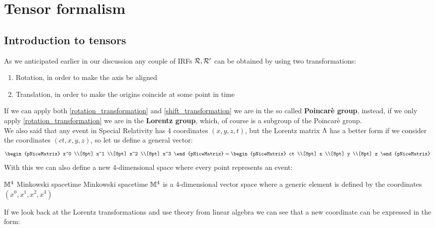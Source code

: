 \chapter{Tensor formalism}
\section{Introduction to tensors}
As we anticipated earlier in our discussion any couple of IRFs $\mathcal{R}, \mathcal{R}'$ can be obtained by using two transformations:
\begin{enumerate}
  \item Rotation, in order to make the axis be aligned \label{rotation_transformation}
  \item Translation, in order to make the origins coincide at some point in time \label{shift_transformation}
\end{enumerate}
If we can apply both \eqref{rotation_transformation} and \eqref{shift_transformation} we are in the so called \textbf{Poincarè group}, instead, if we only apply \eqref{rotation_transformation} we are in the \textbf{Lorentz group}, which, of course is a subgroup of the Poincarè group.\\
We also said that any event in Special Relativity has 4 coordinates $(x,y,z,t)$, but the Lorentz matrix $\Lambda$ has a better form if we consider the coordinates $(ct,x,y,z)$, so let us define a general vector:
\begin{equation}
  \begin{pNiceMatrix}
    x^0 \\[8pt]
    x^1 \\[8pt]
    x^2 \\[8pt]
    x^3
  \end{pNiceMatrix} =
  \begin{pNiceMatrix}
    ct \\[8pt]
    x \\[8pt]
    y \\[8pt]
    z
  \end{pNiceMatrix}
\end{equation}
With this we can also define a new 4-dimensional space where every point represents an event:
\begin{definition}{$\mathbb{M}^4$ Minkowski spacetime}
  Minkowski spacetime $\mathbb{M}^4$ is a 4-dimensional vector space where a generic element is defined by the coordinates $(x^0, x^1, x^2, x^3)$
\end{definition}
If we look back at the Lorentz transformations and use theory from linear algebra we can see that a new coordinate can be expressed in the form:
